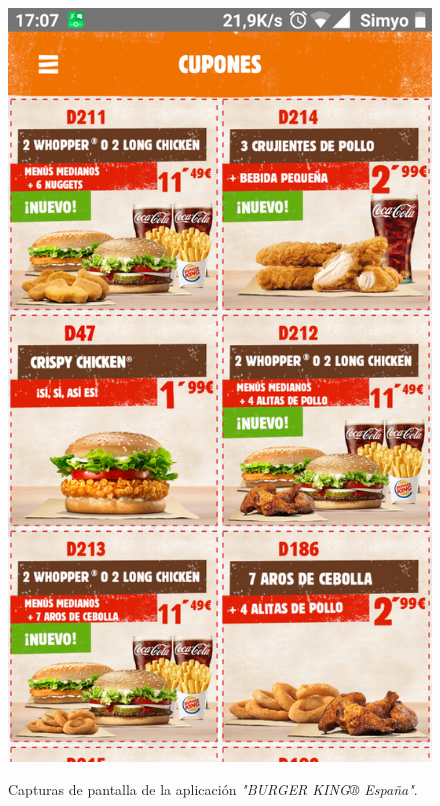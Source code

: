 \documentclass[twoside]{report}
\begin{document}
\begin{figure}[H]
\begin{center}
\includegraphics[scale=0.25]{images/restaurantes/burry1.png}
\caption{Capturas de pantalla de la aplicación \textit{"BURGER KING® España"}.} \cite{burgerk}
\end{center}
\end{figure}
\end{document}
